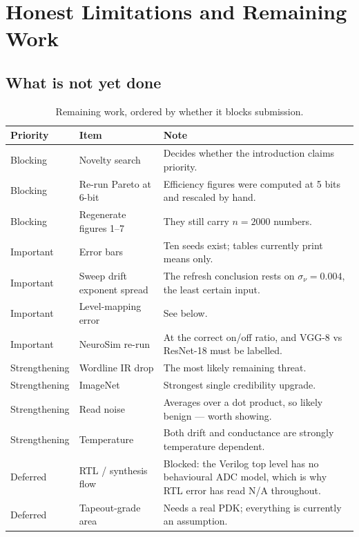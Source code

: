 \documentclass[11pt,a4paper]{report}
\begin{document}
\chapter{Honest Limitations and Remaining Work}

\section{What is not yet done}

\begin{table}[h]
\centering
\caption{Remaining work, ordered by whether it blocks submission.}
\begin{tabular}{llp{6.4cm}}
\toprule
Priority & Item & Note \\
\midrule
Blocking & Novelty search & Decides whether the introduction claims priority. \\
Blocking & Re-run Pareto at 6-bit & Efficiency figures were computed at 5 bits and rescaled by hand. \\
Blocking & Regenerate figures 1--7 & They still carry $n=2000$ numbers. \\
\midrule
Important & Error bars & Ten seeds exist; tables currently print means only. \\
Important & Sweep drift exponent spread & The refresh conclusion rests on $\sigma_\nu = 0.004$, the least certain input. \\
Important & Level-mapping error & See below. \\
Important & NeuroSim re-run & At the correct on/off ratio, and VGG-8 vs ResNet-18 must be labelled. \\
\midrule
Strengthening & Wordline IR drop & The most likely remaining threat. \\
Strengthening & ImageNet & Strongest single credibility upgrade. \\
Strengthening & Read noise & Averages over a dot product, so likely benign --- worth showing. \\
Strengthening & Temperature & Both drift and conductance are strongly temperature dependent. \\
\midrule
Deferred & RTL / synthesis flow & Blocked: the Verilog top level has no behavioural ADC model, which is why RTL error has read N/A throughout. \\
Deferred & Tapeout-grade area & Needs a real PDK; everything is currently an assumption. \\
\bottomrule
\end{tabular}
\end{table}
\end{document}
